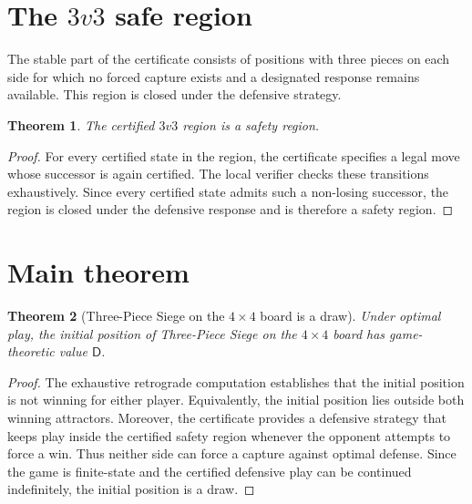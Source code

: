 \documentclass[11pt,a4paper]{article}
\theoremstyle{plain}
\newtheorem{theorem}{Theorem}[section]
\theoremstyle{definition}
\newcommand{\Draw}{\mathsf{D}}
\begin{document}
\section{The $3v3$ safe region}
The stable part of the certificate consists of positions with three pieces on each side for which no forced capture exists and a designated response remains available. This region is closed under the defensive strategy.
\begin{theorem}
The certified $3v3$ region is a safety region.
\end{theorem}
\begin{proof}
For every certified state in the region, the certificate specifies a legal move whose successor is again certified. The local verifier checks these transitions exhaustively. Since every certified state admits such a non-losing successor, the region is closed under the defensive response and is therefore a safety region.
\end{proof}
\section{Main theorem}
\begin{theorem}[Three-Piece Siege on the $4\times4$ board is a draw]
Under optimal play, the initial position of Three-Piece Siege on the $4\times4$ board has game-theoretic value $\Draw$.
\end{theorem}
\begin{proof}
The exhaustive retrograde computation establishes that the initial position is not winning for either player. Equivalently, the initial position lies outside both winning attractors. Moreover, the certificate provides a defensive strategy that keeps play inside the certified safety region whenever the opponent attempts to force a win. Thus neither side can force a capture against optimal defense. Since the game is finite-state and the certified defensive play can be continued indefinitely, the initial position is a draw.
\end{proof}
\end{document}
